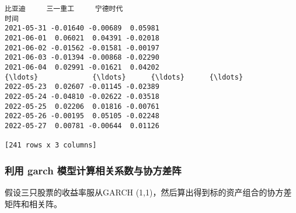 \documentclass[11pt]{article}
\makeatletter
\newcommand{\boxspacing}{\kern\kvtcb@left@rule\kern\kvtcb@boxsep}
\newcommand{\prompt}[4]{
        {\ttfamily\llap{{\color{#2}[#3]:\hspace{3pt}#4}}\vspace{-\baselineskip}}
    }
\makeatother
\begin{document}
            \begin{tcolorbox}[breakable, size=fbox, boxrule=.5pt, pad at break*=1mm, opacityfill=0]
\prompt{Out}{outcolor}{1}{\boxspacing}
\begin{Verbatim}[commandchars=\\\{\}]
                比亚迪     三一重工     宁德时代
时间
2021-05-31 -0.01640 -0.00689  0.05981
2021-06-01  0.06021  0.04391 -0.02018
2021-06-02 -0.01562 -0.01581 -0.00197
2021-06-03 -0.01394 -0.00868 -0.02290
2021-06-04  0.02991 -0.01621  0.04202
{\ldots}             {\ldots}      {\ldots}      {\ldots}
2022-05-23  0.02607 -0.01145 -0.02389
2022-05-24 -0.04810 -0.02622 -0.03518
2022-05-25  0.02206  0.01816 -0.00761
2022-05-26 -0.00195  0.05105 -0.02248
2022-05-27  0.00781 -0.00644  0.01126

[241 rows x 3 columns]
\end{Verbatim}
\end{tcolorbox}

    \hypertarget{ux5229ux7528-garch-ux6a21ux578bux8ba1ux7b97ux76f8ux5173ux7cfbux6570ux4e0eux534fux65b9ux5deeux9635}{%
\subsubsection{利用 garch
模型计算相关系数与协方差阵}\label{ux5229ux7528-garch-ux6a21ux578bux8ba1ux7b97ux76f8ux5173ux7cfbux6570ux4e0eux534fux65b9ux5deeux9635}}

假设三只股票的收益率服从GARCH
(1,1)，然后算出得到标的资产组合的协方差矩阵和相关阵。
\end{document}
